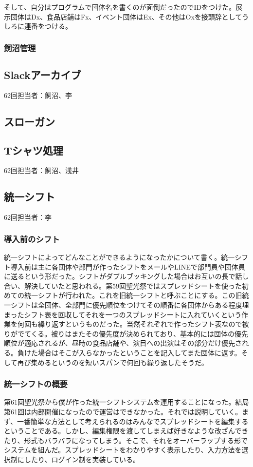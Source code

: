 \documentclass[dvipdfmx,jb5]{jarticle}
\begin{document}
 そして、自分はプログラムで団体名を書くのが面倒だったのでIDをつけた。展示団体はDx、食品店舗はFx、イベント団体はEx、その他はOxを接頭辞としてうしろに連番をつける。
 \subsubsection{飼沼管理}

 \subsection{Slackアーカイブ}
 62回担当者：飼沼、李


 \subsection{スローガン}

 \subsection{Tシャツ処理}
 62回担当者：飼沼、浅井

 \subsection{統一シフト}\label{sec:統一シフト}
 62回担当者：李
  \subsubsection{導入前のシフト}
  統一シフトによってどんなことができるようになったかについて書く。統一シフト導入前は主に各団体や部門が作ったシフトをメールやLINEで部門員や団体員に送るという形だった。シフトがダブルブッキングした場合はお互いの長で話し合い、解決していたと思われる。第59回聖光祭ではスプレッドシートを使った初めての統一シフトが行われた。これを旧統一シフトと呼ぶことにする。この旧統一シフトは全団体、全部門に優先順位をつけてその順番に各団体からある程度埋まったシフト表を回収してそれを一つのスプレッドシートに入れていくという作業を何回も繰り返すというものだった。当然それぞれで作ったシフト表なので被りがでてくる。被りはまたその優先度が決められており、基本的には団体の優先順位が適応されるが、昼時の食品店舗や、演目への出演はその部分だけ優先される。負けた場合はそこが入らなかったということを記入してまた団体に返す。そして再び集めるというのを短いスパンで何回も繰り返したそうだ。
  \subsubsection{統一シフトの概要}
  第61回聖光祭から僕が作った統一シフトシステムを運用することになった。結局第61回は内部開催になったので運営はできなかった。それでは説明していく。まず、一番簡単な方法として考えられるのはみんなでスプレッドシートを編集するということである。しかし、編集権限を渡してしまえば好きなような改ざんできたり、形式もバラバラになってしまう。そこで、それをオーバーラップする形でシステムを組んだ。スプレッドシートをわかりやすく表示したり、入力方法を選択制にしたり、ログイン制を実装している。
\end{document}
